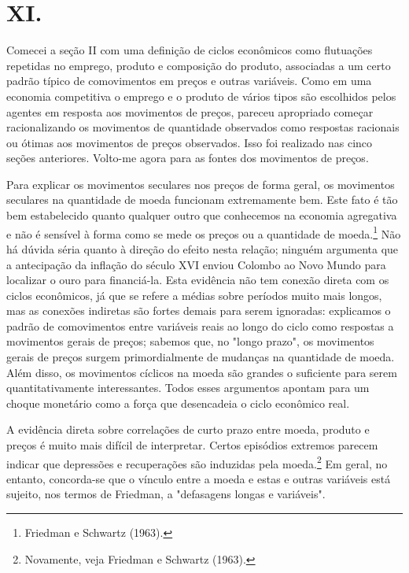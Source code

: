 \documentclass[12pt]{article}
\begin{document}
\section*{XI.}

Comecei a seção II com uma definição de ciclos econômicos como flutuações repetidas no emprego, produto e composição do produto, associadas a um certo padrão típico de comovimentos em preços e outras variáveis. Como em uma economia competitiva o emprego e o produto de vários tipos são escolhidos pelos agentes em resposta aos movimentos de preços, pareceu apropriado começar racionalizando os movimentos de quantidade observados como respostas racionais ou ótimas aos movimentos de preços observados. Isso foi realizado nas cinco seções anteriores. Volto-me agora para as fontes dos movimentos de preços.

Para explicar os movimentos seculares nos preços de forma geral, os movimentos seculares na quantidade de moeda funcionam extremamente bem. Este fato é tão bem estabelecido quanto qualquer outro que conhecemos na economia agregativa e não é sensível à forma como se mede os preços ou a quantidade de moeda.\footnote{Friedman e Schwartz (1963).} Não há dúvida séria quanto à direção do efeito nesta relação; ninguém argumenta que a antecipação da inflação do século XVI enviou Colombo ao Novo Mundo para localizar o ouro para financiá-la. Esta evidência não tem conexão direta com os ciclos econômicos, já que se refere a médias sobre períodos muito mais longos, mas as conexões indiretas são fortes demais para serem ignoradas: explicamos o padrão de comovimentos entre variáveis reais ao longo do ciclo como respostas a movimentos gerais de preços; sabemos que, no "longo prazo", os movimentos gerais de preços surgem primordialmente de mudanças na quantidade de moeda. Além disso, os movimentos cíclicos na moeda são grandes o suficiente para serem quantitativamente interessantes. Todos esses argumentos apontam para um choque monetário como a força que desencadeia o ciclo econômico real.

A evidência direta sobre correlações de curto prazo entre moeda, produto e preços é muito mais difícil de interpretar. Certos episódios extremos parecem indicar que depressões e recuperações são induzidas pela moeda.\footnote{Novamente, veja Friedman e Schwartz (1963).} Em geral, no entanto, concorda-se que o vínculo entre a moeda e estas e outras variáveis está sujeito, nos termos de Friedman, a "defasagens longas e variáveis".
\end{document}
